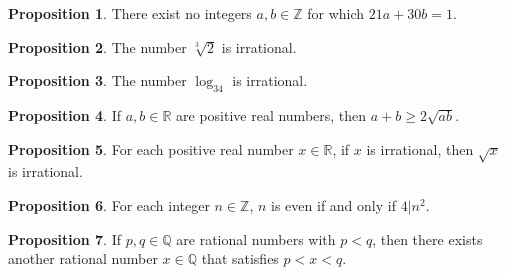 \documentclass[11pt]{article}
\theoremstyle{definition}
\theoremstyle{theorem}
\newtheorem{proposition}{Proposition}
\begin{document}
\begin{proposition}%
  There exist no integers $a,b \in \mathbb{Z}$ for which $21a+30b=1$.
\end{proposition}

\begin{proposition}%
  The number $\sqrt[3]{2}$ is irrational.
\end{proposition}

\begin{proposition}%
  The number $\log_34$ is irrational.
\end{proposition}

\begin{proposition}%
  If $a, b \in \mathbb{R}$ are positive real numbers, then $a+b \geq 2\sqrt{ab}$.
\end{proposition}

\begin{proposition}%
  For each positive real number $x \in \mathbb{R}$, if $x$ is irrational, then $\sqrt{x}$ is irrational.
\end{proposition}

\begin{proposition}
  For each integer $n \in \mathbb{Z}$, $n$ is even if and only if $4 \vert n^2$.
\end{proposition}

\begin{proposition}
  If $p, q \in \mathbb{Q}$ are rational numbers with $p < q$, then there exists another rational number $x \in \mathbb{Q}$ that
  satisfies $p < x <  q$.
\end{proposition}
\end{document}
